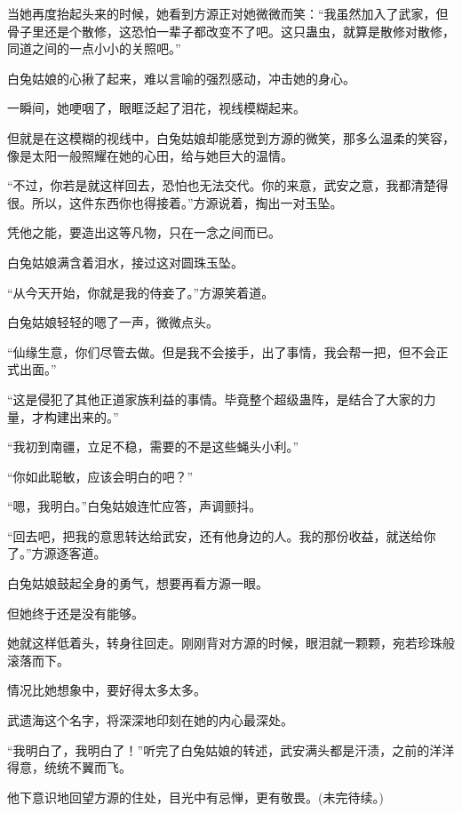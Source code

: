 \begin{this_body}
当她再度抬起头来的时候，她看到方源正对她微微而笑：“我虽然加入了武家，但骨子里还是个散修，这恐怕一辈子都改变不了吧。这只蛊虫，就算是散修对散修，同道之间的一点小小的关照吧。”

白兔姑娘的心揪了起来，难以言喻的强烈感动，冲击她的身心。

一瞬间，她哽咽了，眼眶泛起了泪花，视线模糊起来。

但就是在这模糊的视线中，白兔姑娘却能感觉到方源的微笑，那多么温柔的笑容，像是太阳一般照耀在她的心田，给与她巨大的温情。

“不过，你若是就这样回去，恐怕也无法交代。你的来意，武安之意，我都清楚得很。所以，这件东西你也得接着。”方源说着，掏出一对玉坠。

凭他之能，要造出这等凡物，只在一念之间而已。

白兔姑娘满含着泪水，接过这对圆珠玉坠。

“从今天开始，你就是我的侍妾了。”方源笑着道。

白兔姑娘轻轻的嗯了一声，微微点头。

“仙缘生意，你们尽管去做。但是我不会接手，出了事情，我会帮一把，但不会正式出面。”

“这是侵犯了其他正道家族利益的事情。毕竟整个超级蛊阵，是结合了大家的力量，才构建出来的。”

“我初到南疆，立足不稳，需要的不是这些蝇头小利。”

“你如此聪敏，应该会明白的吧？”

“嗯，我明白。”白兔姑娘连忙应答，声调颤抖。

“回去吧，把我的意思转达给武安，还有他身边的人。我的那份收益，就送给你了。”方源逐客道。

白兔姑娘鼓起全身的勇气，想要再看方源一眼。

但她终于还是没有能够。

她就这样低着头，转身往回走。刚刚背对方源的时候，眼泪就一颗颗，宛若珍珠般滚落而下。

情况比她想象中，要好得太多太多。

武遗海这个名字，将深深地印刻在她的内心最深处。

“我明白了，我明白了！”听完了白兔姑娘的转述，武安满头都是汗渍，之前的洋洋得意，统统不翼而飞。

他下意识地回望方源的住处，目光中有忌惮，更有敬畏。(未完待续。)

\end{this_body}

